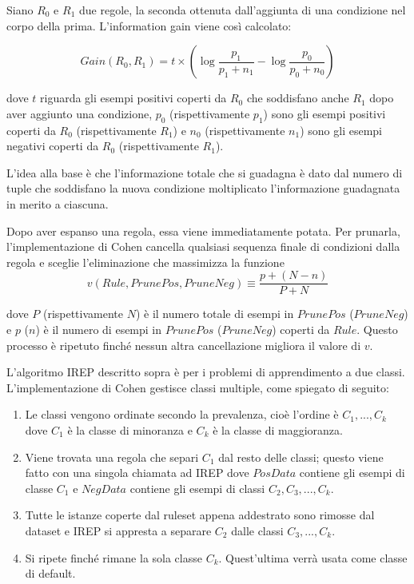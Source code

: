 Siano $R_0$ e $R_1$ due regole, la seconda ottenuta dall'aggiunta di una condizione nel corpo della prima. L'information gain viene così calcolato:

$$
Gain(R_0,R_1) = t \times \left(\log{\dfrac{p_1}{p_1 + n_1}} - \log{\dfrac{p_0}{p_0 + n_0}}\right)
$$

dove $t$ riguarda gli esempi positivi coperti da $R_0$ che soddisfano anche $R_1$ dopo aver aggiunto una condizione, $p_0$ (rispettivamente $p_1$) sono gli esempi positivi coperti da $R_0$ (rispettivamente $R_1$) e  $n_0$ (rispettivamente $n_1$) sono gli esempi negativi coperti da $R_0$ (rispettivamente $R_1$).

L'idea alla base è che l'informazione totale che si guadagna è dato dal numero di tuple che soddisfano la nuova condizione moltiplicato l'informazione guadagnata in merito a ciascuna\cite{Quinlan1990}.

Dopo aver espanso una regola, essa viene immediatamente potata. Per prunarla, l'implementazione di Cohen cancella qualsiasi sequenza finale di condizioni dalla regola e sceglie l'eliminazione che massimizza la funzione
\begin{equation}
	\label{eq:rulval}
	v(Rule, PrunePos, PruneNeg) \equiv \frac{p + (N - n)}{P + N}
\end{equation}

dove $P$ (rispettivamente $N$) è il numero totale di esempi in $PrunePos$ \linebreak ($PruneNeg$) e $p$ ($n$) è il numero di esempi in $PrunePos$ ($PruneNeg$) coperti da $Rule$. Questo processo è ripetuto finché nessun altra cancellazione migliora il valore di $v$.

L'algoritmo IREP descritto sopra è per i problemi di apprendimento a due classi. L'implementazione di Cohen gestisce classi multiple, come spiegato di seguito:
\begin{enumerate}
	\item Le classi vengono ordinate secondo la prevalenza, cioè l'ordine è $C_1,...,C_k$ dove $C_1$ è la classe di minoranza e $C_k$ è la classe di maggioranza.
	\item Viene trovata una regola che separi $C_1$ dal resto delle classi; questo viene fatto con una singola chiamata ad IREP dove $PosData$ contiene gli esempi di classe $C_1$ e $NegData$ contiene gli esempi di classi $C_2,C_3,...,C_k$.
	\item Tutte le istanze coperte dal ruleset appena addestrato sono rimosse dal dataset e IREP si appresta a separare $C_2$ dalle classi $C_3,...,C_k$.
	\item Si ripete finché rimane la sola classe $C_k$. Quest'ultima verrà usata come classe di default.
\end{enumerate}

